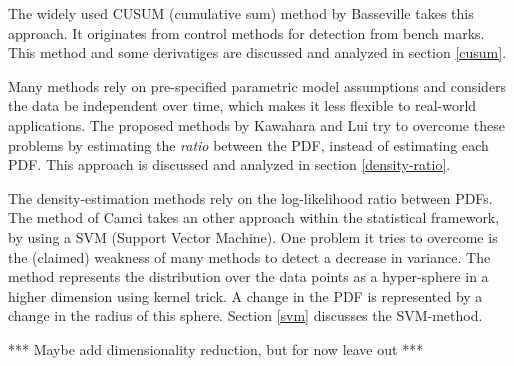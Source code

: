The widely used CUSUM (cumulative sum) method by Basseville \etal \cite{basseville1993detection} takes this approach.
It originates from control methods for detection from bench marks.
This method and some derivatiges are discussed and analyzed in section \ref{cusum}.

Many methods rely on pre-specified parametric model assumptions and considers the data be independent over time, which makes it less flexible to real-world applications.
The proposed methods by Kawahara \etal \cite{kawahara2009change} and Lui \etal \cite{liu2013change} try to overcome these problems by estimating the \emph{ratio} between the PDF, instead of estimating each PDF.
This approach is discussed and analyzed in section \ref{density-ratio}.

The density-estimation methods rely on the log-likelihood ratio between PDFs.
The method of Camci \cite{camci2010change} takes an other approach within the statistical framework, by using a SVM (Support Vector Machine).
One problem it tries to overcome is the (claimed) weakness of many methods to detect a decrease in variance.
The method represents the distribution over the data points as a hyper-sphere in a higher dimension using kernel trick.
A change in the PDF is represented by a change in the radius of this sphere.
Section \ref{svm} discusses the SVM-method.


*** Maybe add dimensionality reduction, but for now leave out ***









% 

